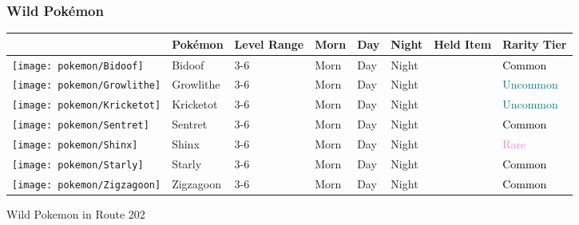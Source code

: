 \subsubsection{Wild Pokémon}%
\label{ssubsec:WildPokmon}%
\begin{longtable}{||l l l l l l l l||}%
\hline%
&Pokémon&Level Range&Morn&Day&Night&Held Item&Rarity Tier\\%
\hline%
\endhead%
\hline%
\texttt{[image: pokemon/Bidoof]}&Bidoof&3{-}6&Morn&Day&Night&&\textcolor{black}{%
Common%
}\\%
\hline%
\texttt{[image: pokemon/Growlithe]}&Growlithe&3{-}6&Morn&Day&Night&&\textcolor{teal}{%
Uncommon%
}\\%
\hline%
\texttt{[image: pokemon/Kricketot]}&Kricketot&3{-}6&Morn&Day&Night&&\textcolor{teal}{%
Uncommon%
}\\%
\hline%
\texttt{[image: pokemon/Sentret]}&Sentret&3{-}6&Morn&Day&Night&&\textcolor{black}{%
Common%
}\\%
\hline%
\texttt{[image: pokemon/Shinx]}&Shinx&3{-}6&Morn&Day&Night&&\textcolor{violet}{%
Rare%
}\\%
\hline%
\texttt{[image: pokemon/Starly]}&Starly&3{-}6&Morn&Day&Night&&\textcolor{black}{%
Common%
}\\%
\hline%
\texttt{[image: pokemon/Zigzagoon]}&Zigzagoon&3{-}6&Morn&Day&Night&&\textcolor{black}{%
Common%
}\\%
\hline%
\end{longtable}%
\caption{Wild Pokemon in Route 202}